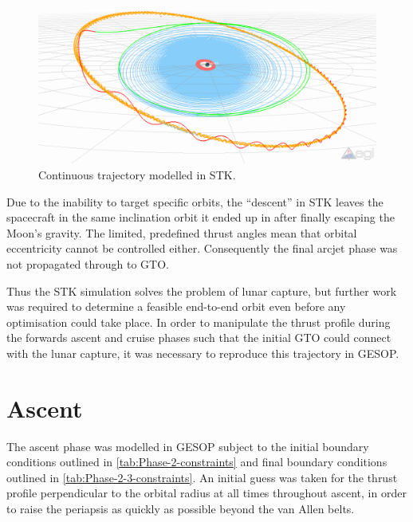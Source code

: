 \begin{figure}
\caption{Continuous trajectory modelled in STK.} \label{fig:STK}
\centering
\includegraphics[width=\textwidth]{Images/STK/trajectory_white.png}
\end{figure}

Due to the inability to target specific orbits, the \enquote{descent} in STK leaves the spacecraft in the same inclination orbit it ended up in after finally escaping the Moon's gravity. The limited, predefined thrust angles mean that orbital eccentricity cannot be controlled either. Consequently the final arcjet phase was not propagated through to GTO. 

Thus the STK simulation solves the problem of lunar capture, but further work was required to determine a feasible end-to-end orbit even before any optimisation could take place. In order to manipulate the thrust profile during the forwards ascent and cruise phases such that the initial GTO could connect with the lunar capture, it was necessary to reproduce this trajectory in GESOP. 


\section{Ascent} \label{sec:Ascent}
The ascent phase was modelled in GESOP subject to the initial boundary conditions outlined in \autoref{tab:Phase-2-constraints} and final boundary conditions outlined in \autoref{tab:Phase-2-3-constraints}. An initial guess was taken for the thrust profile perpendicular to the orbital radius at all times throughout ascent, in order to raise the periapsis as quickly as possible beyond the van Allen belts.

